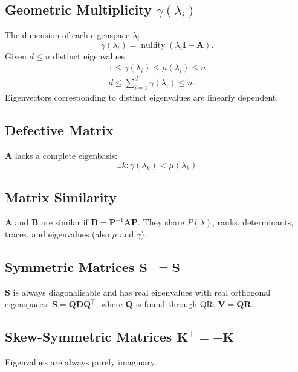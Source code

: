 \documentclass{article}
\DeclareMathOperator*{\nullity}{nullity}
\begin{document}
\begin{multicols*}{3}
    \subsection{Geometric Multiplicity \texorpdfstring{\(\gamma\left( \lambda_i \right)\)}{gamma(lambda i)}}
    The dimension of each eigenspace \(\lambda_i\)
    \begin{equation*}
        \gamma \left( \lambda_i \right) = \nullity{\left( \lambda_i \symbf{I} - \symbf{A} \right)}.
    \end{equation*}
    Given \(d \leq n\) distinct eigenvalues,
    \begin{gather*}
        1 \leq \gamma\left( \lambda_i \right) \leq \mu\left( \lambda_i \right) \leq n \\
        d \leq \sum_{i = 1}^d \gamma \left( \lambda_i \right) \leq n.
    \end{gather*}
    Eigenvectors corresponding to distinct eigenvalues are linearly dependent.
    \subsection{Defective Matrix}
    \(\symbf{A}\) lacks a complete eigenbasis:
    \begin{equation*}
        \exists k : \gamma\left( \lambda_k \right) < \mu\left( \lambda_k \right)
    \end{equation*}
    \subsection{Matrix Similarity}
    \(\symbf{A}\) and \(\symbf{B}\) are similar if \(\symbf{B} = \symbf{P}^{-1} \symbf{A} \symbf{P}\).
    They share \(P(\lambda)\), ranks, determinants, traces, and
    eigenvalues (also \(\mu\) and \(\gamma\)).
    \subsection{Symmetric Matrices \texorpdfstring{\(\symbf{S}^\top = \symbf{S}\)}{S' = S}}
    \(\symbf{S}\) is always diagonalisable and has
    real eigenvalues with real orthogonal eigenspaces: \(\symbf{S} = \symbf{Q} \symbf{D} \symbf{Q}^\top\), where \(\symbf{Q}\) is found through QR\@: \(\symbf{V} = \symbf{Q} \symbf{R}\).
    \subsection{Skew-Symmetric Matrices \texorpdfstring{\(\symbf{K}^\top = -\symbf{K}\)}{K' = -K}}
    Eigenvalues are always purely imaginary.

\end{multicols*}
\end{document}
